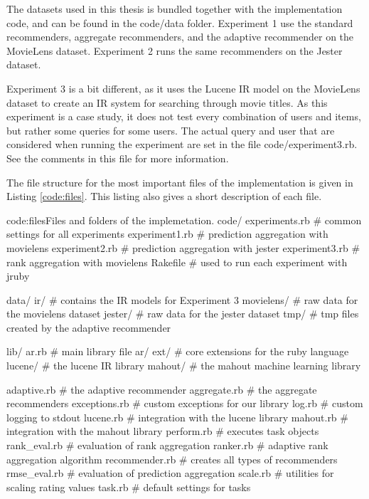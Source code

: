 The datasets used in this thesis is bundled together with the implementation code,
and can be found in the \textsf{code/data} folder.
Experiment 1 use the standard recommenders, aggregate recommenders,
and the adaptive recommender on the MovieLens dataset.
Experiment 2 runs the same recommenders on the Jester dataset.

Experiment 3 is a bit different, as it uses the Lucene IR model
on the MovieLens dataset to create an IR system for searching
through movie titles.
As this experiment is a case study, it does not test every combination
of users and items, but rather some queries for some users.
The actual query and user that are considered when running the 
experiment are set in the file \textsf{code/experiment3.rb}.
See the comments in this file for more information.

The file structure for the most important files of the implementation is given in Listing \ref{code:files}.
This listing also gives a short description of each file.

\begin{implementation}{code:files}{Files and folders of the implemetation.}
code/
  experiments.rb     # common settings for all experiments
  experiment1.rb     # prediction aggregation with movielens
  experiment2.rb     # prediction aggregation with jester
  experiment3.rb     # rank aggregation with movielens
  Rakefile           # used to run each experiment with jruby

  data/
    ir/              # contains the IR models for Experiment 3
    movielens/       # raw data for the movielens dataset
    jester/          # raw data for the jester dataset
    tmp/             # tmp files created by the adaptive recommender

  lib/
    ar.rb            # main library file
    ar/
      ext/           # core extensions for the ruby language
      lucene/        # the lucene IR library
      mahout/        # the mahout machine learning library

      adaptive.rb    # the adaptive recommender
      aggregate.rb   # the aggregate recommenders
      exceptions.rb  # custom exceptions for our library
      log.rb         # custom logging to stdout
      lucene.rb      # integration with the lucene library
      mahout.rb      # integration with the mahout library
      perform.rb     # executes task objects
      rank_eval.rb   # evaluation of rank aggregation
      ranker.rb      # adaptive rank aggregation algorithm
      recommender.rb # creates all types of recommenders
      rmse_eval.rb   # evaluation of prediction aggregation
      scale.rb       # utilities for scaling rating values
      task.rb        # default settings for tasks
\end{implementation}

